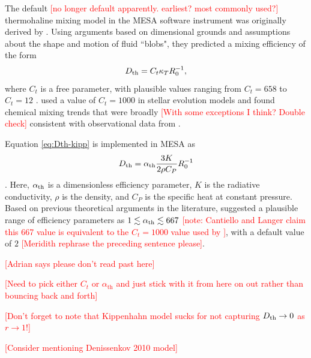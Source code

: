 The default \textcolor{red}{[no longer default apparently. earliest? most commonly used?]} thermohaline mixing model in the MESA software instrument \citep{mesa2} was originally derived by \citet{ulrich_1972, kippenhahn_etal_1980}.
Using arguments based on dimensional grounds and assumptions about the shape and motion of fluid ``blobs", they predicted a mixing efficiency of the form
\begin{equation} \label{eq:Dth-kipp}
    \Dth = C_t \kappa_T R_0^{-1},
\end{equation}
\citep[see Eq.~(5) of][]{charbonnel_thermohaline_2007}
where $C_t$ is a free parameter, with plausible values ranging from $C_t = 658$ \citep{ulrich_1972} to $C_t = 12$ \citep{kippenhahn_etal_1980}. 
\citet{charbonnel_thermohaline_2007} used a value of $C_t = 1000$ in stellar evolution models and found chemical mixing trends that were broadly \textcolor{red}{[With some exceptions I think? Double check]} consistent with observational data from \citet{Gratton2000}.

Equation \eqref{eq:Dth-kipp} is implemented in MESA as
\begin{equation} \label{eq:Dth-kipp-MESA}
    \Dth = \alpha_{\rm{th}} \frac{3 K}{2\rho C_P}R_0^{-1}
\end{equation}
\citep[see Eq.~(14) of][]{mesa2}. 
Here, $\alpha_{\rm{th}}$ is a dimensionless efficiency parameter, $K$ is the radiative conductivity, $\rho$ is the density, and $C_P$ is the specific heat at constant pressure. 
Based on previous theoretical arguments in the literature, \citet{mesa2} suggested a plausible range of efficiency parameters as $1 \lesssim \alpha_{\rm{th}} \lesssim 667$ \textcolor{red}{[note: Cantiello and Langer claim this 667 value is equivalent to the $C_t = 1000$ value used by \citet{charbonnel_thermohaline_2007}]}, with a default value of $2$ \textcolor{red}{[Meridith rephrase the preceding sentence please]}. 

\textcolor{red}{[Adrian says please don't read past here]}

\textcolor{red}{[Need to pick either $C_t$ or $\alpha_\mathrm{th}$ and just stick with it from here on out rather than bouncing back and forth]}

\textcolor{red}{[Don't forget to note that Kippenhahn model sucks for not capturing $D_\mathrm{th} \to 0$ as $r \to 1$!]}

\textcolor{red}{[Consider mentioning Denissenkov 2010 model]}

